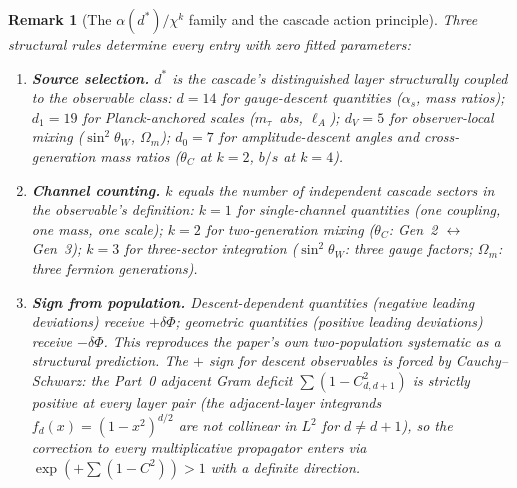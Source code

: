 \documentclass[12pt,a4paper]{article}
\newtheorem*{remark}{Remark}
\begin{document}
\begin{remark}[The $\alpha(d^*)/\chi^k$ family and the cascade action principle]
Three structural rules determine every entry with zero fitted parameters:
\begin{enumerate}
\item \textbf{Source selection.} $d^*$ is the cascade's distinguished layer structurally coupled to the observable class: $d=14$ for gauge-descent quantities ($\alpha_s$, mass ratios); $d_1=19$ for Planck-anchored scales ($m_\tau$~abs, $\ell_A$); $d_V=5$ for observer-local mixing ($\sin^2\theta_W$, $\Omega_m$); $d_0=7$ for amplitude-descent angles and cross-generation mass ratios ($\theta_C$ at $k=2$, $b/s$ at $k=4$).
\item \textbf{Channel counting.} $k$ equals the number of independent cascade sectors in the observable's definition: $k=1$ for single-channel quantities (one coupling, one mass, one scale); $k=2$ for two-generation mixing ($\theta_C$: Gen~2 $\leftrightarrow$ Gen~3); $k=3$ for three-sector integration ($\sin^2\theta_W$: three gauge factors; $\Omega_m$: three fermion generations).
\item \textbf{Sign from population.} Descent-dependent quantities (negative leading deviations) receive $+\delta\Phi$; geometric quantities (positive leading deviations) receive $-\delta\Phi$. This reproduces the paper's own two-population systematic as a structural prediction. The $+$ sign for descent observables is \emph{forced} by Cauchy--Schwarz: the Part~0 adjacent Gram deficit $\sum(1 - C^2_{d,d+1})$ is strictly positive at every layer pair (the adjacent-layer integrands $f_d(x) = (1-x^2)^{d/2}$ are not collinear in $L^2$ for $d\neq d+1$), so the correction to every multiplicative propagator enters via $\exp(+\sum(1-C^2)) > 1$ with a definite direction.


\end{enumerate}
\end{remark}
\end{document}
